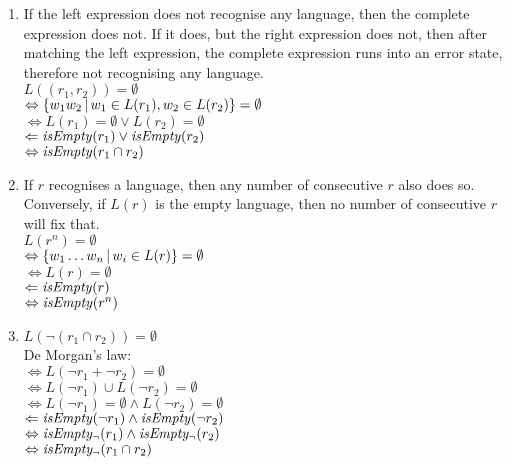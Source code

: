 \begin{lem}
\begin{enumerate}[label=\textbf{(\arabic*)}]
      \item
         If the left expression does not recognise any language, then the
         complete expression does not. If it does, but the right expression does
         not, then after matching the left expression, the complete expression
         runs into an error state, therefore not recognising any language. \\
         $L((r_1, r_2)) = \emptyset$ \\
         $\Leftrightarrow \{ w_1w_2 \operatorname{|} w_1 \in L(r_1), w_2 \in L(r_2) \} = \emptyset$ \\
         $\Leftrightarrow L(r_1) = \emptyset \vee L(r_2) = \emptyset$ \\
         $\Leftarrow \mathit{isEmpty}(r_1) \vee \mathit{isEmpty}(r_2)$ \\
         $\Leftrightarrow \mathit{isEmpty}(r_1 \cap r_2)$

      \item
         If $r$ recognises a language, then any number of consecutive $r$ also
         does so. Conversely, if $L(r)$ is the empty language, then no number of
         consecutive $r$ will fix that. \\
         $L(r^n) = \emptyset$ \\
         $\Leftrightarrow \{ w_1 \dots w_n \operatorname{|} w_i \in L(r) \} = \emptyset$ \\
         $\Leftrightarrow L(r) = \emptyset$ \\
         $\Leftarrow \mathit{isEmpty}(r)$ \\
         $\Leftrightarrow \mathit{isEmpty}(r^n)$

      \item
         $L(\neg(r_1 \cap r_2)) = \emptyset$ \\
         De Morgan's law: \\
         $\Leftrightarrow L(\neg r_1 + \neg r_2) = \emptyset$ \\
         $\Leftrightarrow L(\neg r_1) \cup L(\neg r_2) = \emptyset$ \\
         $\Leftrightarrow L(\neg r_1) = \emptyset \wedge L(\neg r_2) = \emptyset$ \\
         $\Leftarrow \mathit{isEmpty}(\neg r_1) \wedge \mathit{isEmpty}(\neg r_2)$ \\
         $\Leftrightarrow \mathit{isEmpty_\neg}(r_1) \wedge \mathit{isEmpty_\neg}(r_2)$ \\
         $\Leftrightarrow \mathit{isEmpty_\neg}(r_1 \cap r_2)$


\end{enumerate}
\end{lem}
